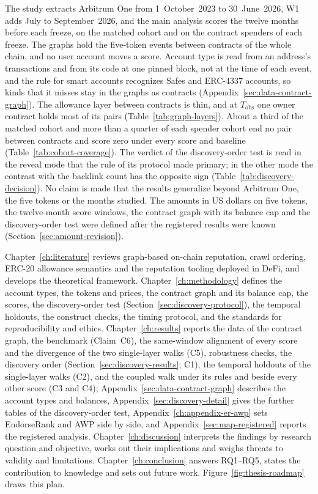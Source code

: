 The study extracts Arbitrum One from 1~October~2023 to 30~June~2026, W1 adds July to September~2026, and the main analysis scores the twelve months before each freeze, on the matched cohort and on the contract spenders of each freeze. The graphs hold the five-token events between contracts of the whole chain, and no user account moves a score. Account type is read from an address's transactions and from its code at one pinned block, not at the time of each event, and the rule for smart accounts recognizes Safes and ERC-4337 accounts, so kinds that it misses stay in the graphs as contracts (Appendix~\ref{sec:data-contract-graph}). The allowance layer between contracts is thin, and at $T_{\mathrm{obs}}$ one owner contract holds most of its pairs (Table~\ref{tab:graph-layers}). About a third of the matched cohort and more than a quarter of each spender cohort end no pair between contracts and score zero under every score and baseline (Table~\ref{tab:cohort-coverage}). The verdict of the discovery-order test is read in the reveal mode that the rule of its protocol made primary; in the other mode the contrast with the backlink count has the opposite sign (Table~\ref{tab:discovery-decision}). No claim is made that the results generalize beyond Arbitrum One, the five tokens or the months studied. The amounts in US dollars on five tokens, the twelve-month score windows, the contract graph with its balance cap and the discovery-order test were defined after the registered results were known (Section~\ref{sec:amount-revision}).


Chapter~\ref{ch:literature} reviews graph-based on-chain reputation, crawl ordering, ERC-20 allowance semantics and the reputation tooling deployed in DeFi, and develops the theoretical framework. Chapter~\ref{ch:methodology} defines the account types, the tokens and prices, the contract graph and its balance cap, the scores, the discovery-order test (Section~\ref{sec:discovery-protocol}), the temporal holdouts, the construct checks, the timing protocol, and the standards for reproducibility and ethics. Chapter~\ref{ch:results} reports the data of the contract graph, the benchmark (Claim~C6), the same-window alignment of every score and the divergence of the two single-layer walks (C5), robustness checks, the discovery order (Section~\ref{sec:discovery-results}; C1), the temporal holdouts of the single-layer walks (C2), and the coupled walk under its rules and beside every other score (C3 and C4); Appendix~\ref{sec:data-contract-graph} describes the account types and balances, Appendix~\ref{sec:discovery-detail} gives the further tables of the discovery-order test, Appendix~\ref{ch:appendix-er-awp} sets EndorseRank and AWP side by side, and Appendix~\ref{sec:map-registered} reports the registered analysis. Chapter~\ref{ch:discussion} interprets the findings by research question and objective, works out their implications and weighs threats to validity and limitations. Chapter~\ref{ch:conclusion} answers RQ1--RQ5, states the contribution to knowledge and sets out future work. Figure~\ref{fig:thesis-roadmap} draws this plan.

